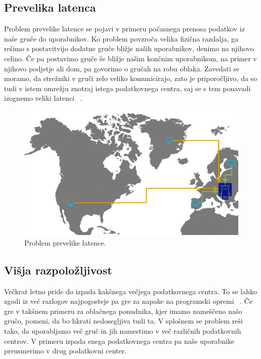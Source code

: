 \documentclass[a4paper, 12pt]{book}
\begin{document}
\subsection{Prevelika latenca}
Problem prevelike latence se pojavi v primeru počasnega prenosa podatkov iz naše gruče do uporabnikov.
Ko problem povzroča velika fizična razdalja, ga rešimo s postavitvijo dodatne gruče bližje naših uporabnikov, denimo na njihovo celino.
Če pa postavimo gruče še bližje našim končnim uporabnikom, na primer v njihovo podjetje ali dom, pa govorimo o gručah na robu oblaka.
Zavedati se moramo, da strežniki v gruči zelo veliko komunicirajo, zato je priporočljivo, da so tudi v istem omrežju znotraj istega podatkovnega centra, saj se s tem ponavadi izognemo veliki latenci ~\cite{kube-and-edge}.
\begin{figure}[h]
\begin{center}
  \includegraphics[width=1.0\textwidth]{images/problem-prevelike-latence.pdf}
\end{center}
\caption{Problem prevelike latence.}
\label{problem-prevelike-latence}
\end{figure}
\subsection{Višja razpoložljivost}
Večkrat letno pride do izpada kakšnega večjega podatkovnega centra. 
To se lahko zgodi iz več razlogov najpogosteje pa gre za napake na programski opremi ~\cite{common-outages}.
Če gre v takšnem primeru za oblačnega ponudnika, kjer imamo nameščeno našo gručo, pomeni, da bo hkrati nedosegljiva tudi ta.
V splošnem se problem reši tako, da uporabljamo več gruč in jih namestimo v več različnih podatkovnih centrov.
V primeru izpada enega podatkovnega centra pa naše uporabnike preusmerimo v drug podatkovni center.
\end{document}
